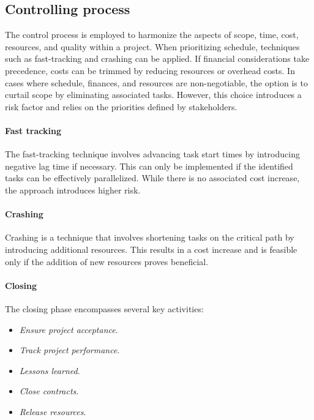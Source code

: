 \subsection{Controlling process}
The control process is employed to harmonize the aspects of scope, time, cost, resources, and quality within a project. 
When prioritizing schedule, techniques such as fast-tracking and crashing can be applied. 
If financial considerations take precedence, costs can be trimmed by reducing resources or overhead costs. 
In cases where schedule, finances, and resources are non-negotiable, the option is to curtail scope by eliminating associated tasks. 
However, this choice introduces a risk factor and relies on the priorities defined by stakeholders.

\paragraph*{Fast tracking}
The fast-tracking technique involves advancing task start times by introducing negative lag time if necessary.
This can only be implemented if the identified tasks can be effectively parallelized.
While there is no associated cost increase, the approach introduces higher risk.

\paragraph*{Crashing}
Crashing is a technique that involves shortening tasks on the critical path by introducing additional resources. 
This results in a cost increase and is feasible only if the addition of new resources proves beneficial.

\paragraph*{Closing}
The closing phase encompasses several key activities:
\begin{itemize}
    \item \textit{Ensure project acceptance}.
    \item \textit{Track project performance}.
    \item \textit{Lessons learned}.
    \item \textit{Close contracts}.
    \item \textit{Release resources}.
\end{itemize}